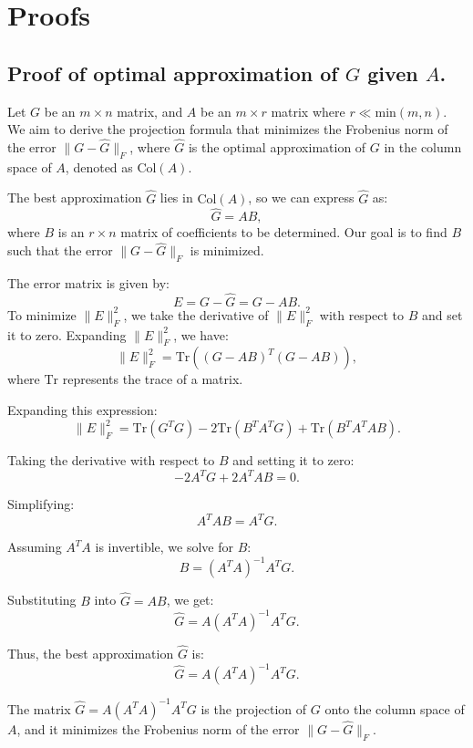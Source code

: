 \section{Proofs}

\subsection{Proof of optimal approximation of \(G\) given \(A\).}
\label{inverse}

Let \( G \) be an \( m \times n \) matrix, and \( A \) be an \( m \times r \) matrix where \( r \ll \text{min}(m,n) \). We aim to derive the projection formula that minimizes the Frobenius norm of the error \( \| G - \hat{G} \|_F \), where \( \hat{G} \) is the optimal approximation of \( G \) in the column space of \( A \), denoted as \( \text{Col}(A) \).

The best approximation \( \hat{G} \) lies in \( \text{Col}(A) \), so we can express \( \hat{G} \) as:
\[
\hat{G} = A B,
\]
where \( B \) is an \( r \times n \) matrix of coefficients to be determined. Our goal is to find \( B \) such that the error \( \| G - \hat{G} \|_F \) is minimized.

The error matrix is given by:
\[
E = G - \hat{G} = G - A B.
\]
To minimize \( \| E \|_F^2 \), we take the derivative of \( \| E \|_F^2 \) with respect to \( B \) and set it to zero. Expanding \( \| E \|_F^2 \), we have:
\[
\| E \|_F^2 = \text{Tr}\left((G - A B)^T (G - A B)\right),
\]
where \( \text{Tr} \) represents the trace of a matrix.

Expanding this expression:
\[
\| E \|_F^2 = \text{Tr}(G^T G) - 2 \text{Tr}(B^T A^T G) + \text{Tr}(B^T A^T A B).
\]

Taking the derivative with respect to \( B \) and setting it to zero:
\[
-2 A^T G + 2 A^T A B = 0.
\]

Simplifying:
\[
A^T A B = A^T G.
\]

Assuming \( A^T A \) is invertible, we solve for \( B \):
\[
B = (A^T A)^{-1} A^T G.
\]

Substituting \( B \) into \( \hat{G} = A B \), we get:
\[
\hat{G} = A (A^T A)^{-1} A^T G.
\]

Thus, the best approximation \( \hat{G} \) is:
\[
\boxed{\hat{G} = A(A^T A)^{-1} A^T G.}
\]

The matrix \( \hat{G} = A(A^T A)^{-1} A^T G \) is the projection of \( G \) onto the column space of \( A \), and it minimizes the Frobenius norm of the error \( \| G - \hat{G} \|_F \).


